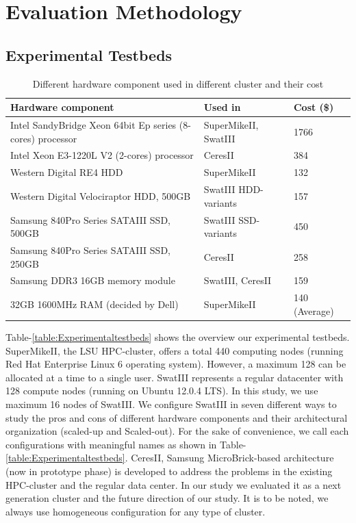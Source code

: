 \documentclass[conference]{IEEEtran}
\begin{document}
\section {Evaluation Methodology} \label{EvaluationMethodology}
\subsection {Experimental Testbeds}
\begin{table}
	\begin{tabular}{ |p{4.4cm} |p{1.6cm} |p{1.6cm} |} \hline
		Hardware component & Used in & Cost (\$)\\ \hline
		Intel SandyBridge Xeon 64bit Ep series (8-cores) processor & SuperMikeII, SwatIII & 1766\\ \hline
		Intel Xeon E3-1220L V2 (2-cores) processor& CeresII & 384\\ \hline
		Western Digital RE4 HDD & SuperMikeII & 132\\ \hline
		Western Digital Velociraptor HDD, 500GB & SwatIII HDD-variants & 157 \\ \hline
		Samsung 840Pro Series SATAIII SSD, 500GB & SwatIII SSD-variants & 450\\ \hline
		Samsung 840Pro Series SATAIII SSD, 250GB & CeresII & 258\\ \hline
		Samsung DDR3 16GB memory module & SwatIII, CeresII & 159\\ \hline
		32GB 1600MHz RAM (decided by Dell) & SuperMikeII  & 140 (Average)\\ \hline
	\end{tabular}
	\caption{Different hardware component used in different cluster and their cost}
	\label{table:PriceOfEachComponent}
\vspace{-2.3em}
\end{table}
Table-\ref{table:Experimentaltestbeds} shows the overview our experimental testbeds. 
SuperMikeII, the LSU HPC-cluster, offers a total 440 computing nodes (running Red Hat Enterprise Linux 6 operating system). However, a maximum 128 can be allocated at a time to a single user. 
SwatIII represents a regular datacenter with 128 compute nodes (running on Ubuntu 12.0.4 LTS). In this study, we use maximum 16 nodes of SwatIII. We configure SwatIII in seven different ways to study the pros and cons of different hardware components and their architectural organization (scaled-up and Scaled-out). For the sake of convenience, we call each configurations with meaningful names as shown in Table-\ref{table:Experimentaltestbeds}. 
CeresII, Samsung MicroBrick-based architecture (now in prototype phase) is developed to address the problems in the existing HPC-cluster and the regular data center. In our study we evaluated it as a next generation cluster and the future direction of our study. 
It is to be noted, we always use homogeneous configuration for any type of cluster. 
\end{document}
